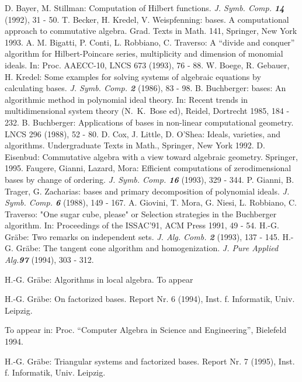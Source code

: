 \pagebreak

\begin{thebibliography}{xxx}
 D. Bayer, M. Stillman: Computation of Hilbert
functions. {\it J. Symb. Comp. \bf 14} (1992), 31 - 50.
 T. Becker, H. Kredel, V. Weispfenning: \gr bases. A
computational approach to commutative algebra. Grad. Texts in Math.
141, Springer, New York 1993.
 A. M. Bigatti, P. Conti, L. Robbiano, C. Traverso: A
``divide and conquer'' algorithm for Hilbert-Poincare series,
multiplicity and dimension of monomial ideals. In: Proc. AAECC-10,
LNCS 673 (1993), 76 - 88.
 W. Boege, R. Gebauer, H. Kredel: Some examples for
solving systems of algebraic equations by calculating \gr bases. {\it
J. Symb. Comp. \bf 2} (1986), 83 - 98.
 B. Buchberger: \gr bases: An algorithmic method in
polynomial ideal theory. In: Recent trends in multidimensional
system theory (N.~K.~Bose ed), Reidel, Dortrecht 1985, 184 - 232.
 B. Buchberger: Applications of \gr bases in non-linear
computational geometry. LNCS 296 (1988), 52 - 80.
 D. Cox, J. Little, D. O'Shea: Ideals, varieties, and
algorithms.  Undergraduate Texts in Math., Springer, New York 1992.
 D. Eisenbud: Commutative algebra with a view toward
algebraic geometry. Springer, 1995. 
 Faugere, Gianni, Lazard, Mora: Efficient computations
of zerodimensional \gr bases by change of ordering. {\it
J. Symb. Comp. \bf 16} (1993), 329 - 344. 
 P. Gianni, B. Trager, G. Zacharias: \gr bases and
primary decomposition of polynomial ideals. {\it J. Symb. Comp. \bf
6} (1988), 149 - 167.
 A. Giovini, T. Mora, G. Niesi, L. Robbiano, C.
Traverso: "One sugar cube, please" or Selection strategies in the
Buchberger algorithm. In: Proceedings of the ISSAC'91, ACM Press
1991, 49 - 54.
 H.-G. Gr\"abe: Two remarks on independent sets.
{\it J. Alg. Comb. \bf 2} (1993), 137 - 145. 
 H.-G. Gr\"abe: The tangent cone algorithm and
homogenization. {\it J. Pure Applied Alg.\bf 97} (1994), 303 - 312.

 H.-G. Gr\"abe: Algorithms in local algebra. To appear

 H.-G. Gr\"abe: On factorized \gr bases. Report Nr. 6
(1994), Inst. f. Informatik, Univ. Leipzig.

To appear in: Proc. ``Computer Algebra in Science and Engineering'',
Bielefeld 1994.

 H.-G. Gr\"abe: Triangular systems and factorized \gr
bases. Report Nr. 7 (1995), Inst. f. Informatik, Univ. Leipzig.


\end{thebibliography}
